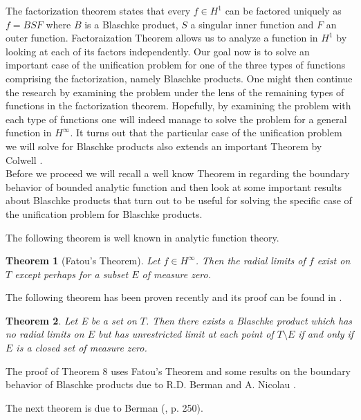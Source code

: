 \documentclass[12pt]{article}
\newtheorem{theorem}{Theorem}
\begin{document}
\noindent The factorization theorem states that every $f\in H^1$ can be factored uniquely as $f=BSF$ where $B$ is a Blaschke product, $S$ a singular inner function and $F$ an outer function. Factoraization Theorem allows us to analyze a function in $H^1$ by looking at each of its factors independently. Our goal now is to solve an important case of the unification problem for one of the three types of functions comprising the factorization, namely Blaschke products. One might then continue the research by examining the problem under the lens of the remaining types of functions in the factorization theorem. Hopefully, by examining the problem with each type of functions one will indeed manage to solve the problem for a general function in $H^\infty$.\vspace{0.12in} It turns out that the particular case of the unification problem we will solve for Blaschke products also extends an important Theorem by Colwell \cite{PE}.\\

Before we proceed we will recall a well know Theorem in regarding the boundary behavior of bounded analytic function and then look at some important results about Blaschke products that turn out to be useful for solving the specific case of the unification problem for Blaschke products.


\noindent The following theorem is well known in analytic function theory.
\begin{theorem}[Fatou's Theorem]
Let $f\in H^\infty$. Then the radial limits of $f$ exist on $T$ except perhaps for a subset $E$ of measure zero.
\end{theorem}
\noindent The following theorem has been proven recently and its proof can be found in \cite{Sp}.

\begin{theorem}
Let E be a set on $T$. Then there exists a Blaschke product which has no radial limits on $E$ but has unrestricted limit at each point of $T\setminus E$ if and only if $E$ is a closed set of measure zero.
\end{theorem}

\noindent The proof of Theorem $8$ uses Fatou's Theorem and some results on the boundary behavior of Blaschke products due to R.D. Berman \cite{BE} and A. Nicolau \cite{NI}.

\noindent The next theorem is due to Berman (\cite{BE}, p. 250).
\end{document}
